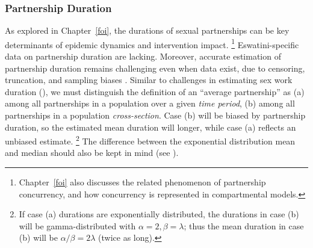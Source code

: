 \subsubsection{Partnership Duration}\label{model.par.sex.dur}
As explored in Chapter~\ref{foi}, the durations of sexual partnerships
can be key determinants of epidemic dynamics and intervention impact.%
\footnote{Chapter~\ref{foi} also discusses the related phenomenon of partnership concurrency,
  and how concurrency is represented in compartmental models.}
Eswatini-specific data on partnership duration are lacking.
Moreover, accurate estimation of partnership duration remains challenging even when data exist,
due to censoring, truncation, and sampling biases \cite{Burington2010}.
Similar to challenges in estimating sex work duration (),
we must distinguish the definition of an ``average partnership'' as
(a) among all partnerships in a population over a given \emph{time period}, \vs
(b) among all partnerships in a population \emph{cross-section}.
Case (b) will be biased by partnership duration,
so the estimated mean duration will longer,
while case (a) reflects an unbiased estimate.%
\footnote{If case (a) durations are exponentially distributed,
  the durations in case (b) will be gamma-distributed with $\alpha = 2, \beta = \lambda$;
  thus the mean duration in case (b) will be $\alpha/\beta = 2\lambda$ (twice as long).}
The difference between the exponential distribution mean and median
should also be kept in mind (see ).
